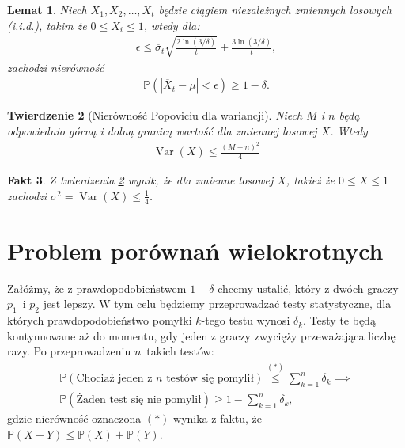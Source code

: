 \documentclass[inzynierska]{pwr_wmat_praca_dyplomowa}
\theoremstyle{plain}
\newtheorem{theorem}{Twierdzenie}
\numberwithin{theorem}{chapter}
\newtheorem{lemma}[theorem]{Lemat}
\newtheorem{fact}[theorem]{Fakt}
\theoremstyle{definition}
\numberwithin{theorem}{chapter}
\DeclareMathOperator{\Var}{\mathrm{Var}}%
\newcommand{\probP}{\mathbb{P}}
\begin{document}
	\begin{lemma}\label{Bernsteina emp ineq lemma}
		Niech $X_1, X_2, \dots, X_t$ będzie ciągiem niezależnych zmiennych losowych (i.i.d.), takim że $0 \le X_i \le 1$, wtedy dla:
		\begin{gather*}
			\epsilon \le \overline{\sigma}_t \sqrt{\frac{2\ln(3/\delta)}{t}} + \frac{3  \ln{(3 / \delta)}}{t},
		\end{gather*}
		zachodzi nierówność
		\begin{gather*}
			\probP(|\overline{X}_t - \mu | < \epsilon ) \ge 1 - \delta.
		\end{gather*}
	\end{lemma}
	\begin{theorem}[Nierówność Popoviciu dla wariancji]
		\label{Popoviciu_ineq}
		Niech $M$ i $n$ będą odpowiednio górną i dolną granicą wartość dla zmiennej losowej $X$. Wtedy
		\begin{gather*}
			\Var (X) \le \frac{(M -n)^2}{4}
		\end{gather*}
	\end{theorem}	
	\begin{fact}
		\label{fact:Popoviciu_ineq}
		Z twierdzenia \ref{Popoviciu_ineq} wynik, że dla zmienne losowej $X$, takież że $0\le X \le1$ zachodzi $\sigma^2 = \Var (X) \le \frac{1}{4}$. 
	\end{fact}
	\section{Problem porównań wielokrotnych}
	Załóżmy, że z prawdopodobieństwem $1-\delta$ chcemy ustalić, który z dwóch graczy $p_1$~i $p_2$ jest lepszy. W tym celu będziemy przeprowadzać testy statystyczne, dla których	prawdopodobieństwo pomyłki $k$-tego testu wynosi $\delta_k$. Testy te będą kontynuowane aż do momentu, gdy jeden z graczy zwycięży przeważająca liczbę razy. Po przeprowadzeniu $n$~takich testów:
	\begin{gather*}
		\probP(\text{Chociaż jeden z $n$ testów się pomylił}) \overset{(*)}{\le} \sum_{k=1}^n \delta_k \implies  \\
	\probP(\text{Żaden test się nie pomylił}) \ge 1 - \sum_{k=1}^n \delta_k,
	\end{gather*} 
	gdzie nierówność oznaczona $(*)$ wynika z faktu, że $\probP(X+Y) \le \probP(X) + \probP(Y)$.
	
\end{document}
